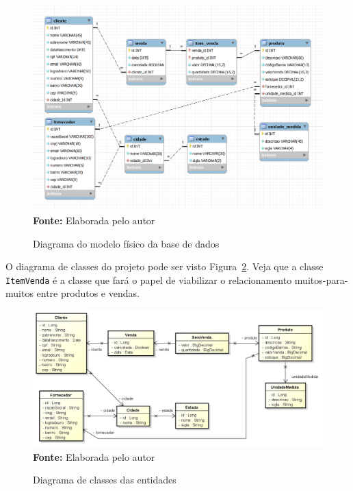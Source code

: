 \FloatBarrier
\begin{figure}[!htbp]
    \centering
    \caption{Diagrama do modelo físico da base de dados}
    \includegraphics[scale=0.5]{imagens/cap08ModeloFisico}
    \\\textbf{Fonte:} Elaborada pelo autor
    \label{fig:cap08ModeloFisico}
\end{figure}
\FloatBarrier

O diagrama de classes do projeto pode ser visto Figura~\ref{fig:cap08DiagramaClasses}. Veja que a classe \texttt{ItemVenda} é a classe que fará o papel de viabilizar o relacionamento muitos-para-muitos entre produtos e vendas.

\FloatBarrier
\begin{figure}[!htbp]
    \centering
    \caption{Diagrama de classes das entidades}
    \includegraphics[scale=0.45]{imagens/cap08DiagramaClasses}
    \\\textbf{Fonte:} Elaborada pelo autor
    \label{fig:cap08DiagramaClasses}
\end{figure}
\FloatBarrier


